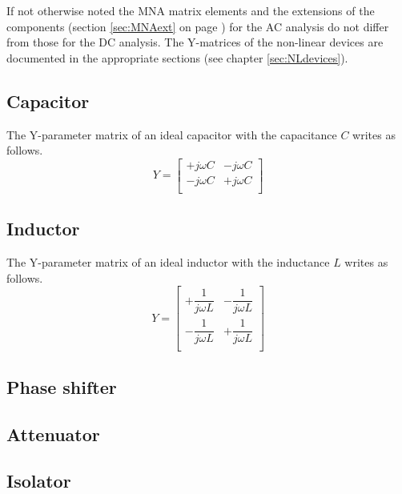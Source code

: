 \documentclass[10pt]{report}
\begin{document}
If not otherwise noted the MNA matrix elements and the extensions of
the components (section \ref{sec:MNAext} on page \pageref{sec:MNAext})
for the AC analysis do not differ from those for the DC analysis.  The
Y-matrices of the non-linear devices are documented in the appropriate
sections (see chapter \ref{sec:NLdevices}).

\subsection{Capacitor}

The Y-parameter matrix of an ideal capacitor with the capacitance $C$
writes as follows.
\begin{equation}
Y =
\begin{bmatrix}
+j\omega C & -j\omega C\\
-j\omega C & +j\omega C\\
\end{bmatrix}
\end{equation}

\subsection{Inductor}

The Y-parameter matrix of an ideal inductor with the inductance $L$
writes as follows.
\begin{equation}
Y =
\begin{bmatrix}
+\dfrac{1}{j\omega L} & -\dfrac{1}{j\omega L}\\
-\dfrac{1}{j\omega L} & +\dfrac{1}{j\omega L}\\
\end{bmatrix}
\end{equation}

\subsection{Phase shifter}

\subsection{Attenuator}

\subsection{Isolator}
\end{document}
